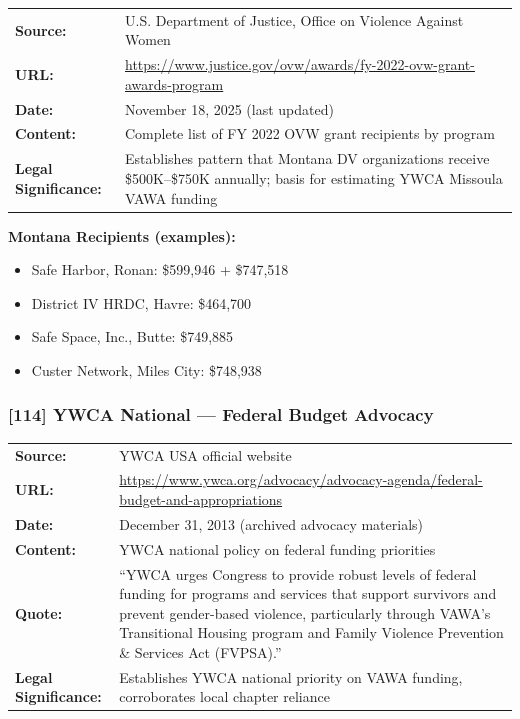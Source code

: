 \documentclass[11pt,letterpaper]{article}
\newcommand{\citeref}[1]{\textbf{\color{NavyBlue}[#1]}}
\begin{document}
\begin{tabular}{@{}p{1.4in}p{4.6in}@{}}
\textbf{Source:} & U.S. Department of Justice, Office on Violence Against Women\\
\textbf{URL:} & \url{https://www.justice.gov/ovw/awards/fy-2022-ovw-grant-awards-program}\\
\textbf{Date:} & November 18, 2025 (last updated)\\
\textbf{Content:} & Complete list of FY 2022 OVW grant recipients by program\\
\textbf{Legal Significance:} & Establishes pattern that Montana DV organizations receive \$500K--\$750K annually; basis for estimating YWCA Missoula VAWA funding\\
\end{tabular}

\vspace{0.1in}

\textbf{Montana Recipients (examples):}
\begin{itemize}[leftmargin=*]
\item Safe Harbor, Ronan: \$599,946 + \$747,518
\item District IV HRDC, Havre: \$464,700
\item Safe Space, Inc., Butte: \$749,885
\item Custer Network, Miles City: \$748,938
\end{itemize}

\subsubsection{\citeref{114} YWCA National --- Federal Budget Advocacy}

\begin{tabular}{@{}p{1.4in}p{4.6in}@{}}
\textbf{Source:} & YWCA USA official website\\
\textbf{URL:} & \url{https://www.ywca.org/advocacy/advocacy-agenda/federal-budget-and-appropriations}\\
\textbf{Date:} & December 31, 2013 (archived advocacy materials)\\
\textbf{Content:} & YWCA national policy on federal funding priorities\\
\textbf{Quote:} & ``YWCA urges Congress to provide robust levels of federal funding for programs and services that support survivors and prevent gender-based violence, particularly through VAWA's Transitional Housing program and Family Violence Prevention \& Services Act (FVPSA).''\\
\textbf{Legal Significance:} & Establishes YWCA national priority on VAWA funding, corroborates local chapter reliance\\
\end{tabular}
\end{document}
